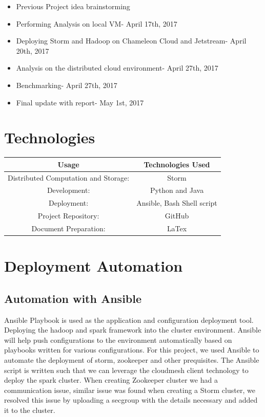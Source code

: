 \documentclass[9pt,twocolumn,twoside]{../../styles/osajnl}
\begin{document}
\begin{itemize}
\item Previous Project idea brainstorming
\item Performing Analysis on local VM- April 17th, 2017
\item Deploying Storm and Hadoop on Chameleon Cloud and Jetstream-
  April 20th, 2017
\item Analysis on the distributed cloud environment- April 27th, 2017
\item Benchmarking- April 27th, 2017
\item Final update with report- May 1st, 2017
\end{itemize}


\section{Technologies}




\begin{center}
 \begin{tabular}{||c c||} 
 \hline
 Usage & Technologies Used\\ [0.5ex]
 \hline\hline
 Distributed Computation and Storage:& Storm \\ 
 \hline
 Development: &Python and Java\\
 \hline
 Deployment: &Ansible, Bash Shell script\\
 \hline
 Project Repository: &GitHub \\
 \hline
 Document Preparation: &LaTex\\ [1ex] 
 \hline
\end{tabular}
\end{center}








  
\section{Deployment Automation}
\subsection{Automation with Ansible}
Ansible Playbook is used as the application and configuration
deployment tool. Deploying the hadoop and spark framework into the
cluster environment. Ansible will help push configurations to the
environment automatically based on playbooks written for various
configurations. For this project, we used Ansible to automate the
deployment of storm, zookeeper and other prequisites. The Ansible
script is written such that we can leverage the cloudmesh client
technology to deploy the spark cluster. When creating Zookeeper
cluster we had a communication issue, similar issue was found when
creating a Storm cluster, we resolved this issue by uploading a
secgroup with the details necessary and added it to the cluster.
\end{document}
